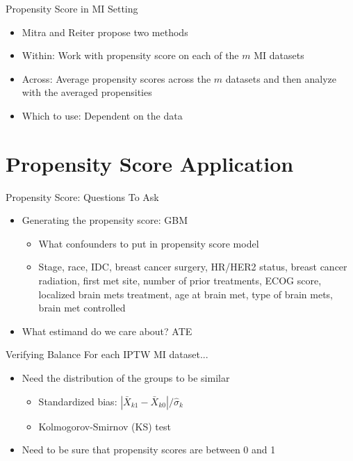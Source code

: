 \begin{frame}{Propensity Score in MI Setting}
\begin{itemize}
 \item Mitra and Reiter propose two methods \cite{Mitra2012}
 \item Within: Work with propensity score on each of the $m$ MI datasets
 \item Across: Average propensity scores across the $m$ datasets and then analyze with the averaged propensities
 \item Which to use: Dependent on the data
\end{itemize} 
\end{frame}

\section{Propensity Score Application}
\begin{frame}{Propensity Score: Questions To Ask}
\begin{itemize}
\item Generating the propensity score: GBM
\begin{itemize}
\item What confounders to put in propensity score model
  \item Stage, race, IDC, breast cancer surgery, HR/HER2 status,
  breast cancer radiation, first met site, number of prior treatments, ECOG score,
  localized brain mets treatment, age at brain met, type of brain mets, brain met controlled
\end{itemize}
\item What estimand do we care about? ATE
\end{itemize} 
\end{frame}



\begin{frame}{Verifying Balance}
For each IPTW MI dataset...
\begin{itemize}
\item Need the distribution of the groups to be similar
\begin{itemize}
\item Standardized bias: $|\bar{X}_{k1}-\bar{X}_{k0}|/ \hat{\sigma}_k$
\item Kolmogorov-Smirnov (KS) test 
\end{itemize}
\item Need to be sure that propensity scores are between 0 and 1
\end{itemize}
\end{frame}


